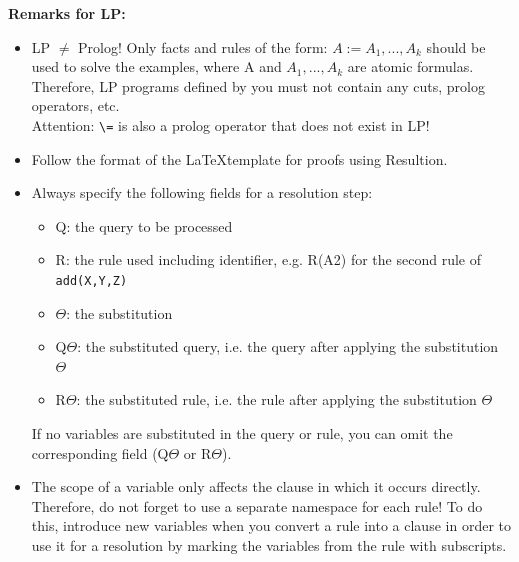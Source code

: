 \documentclass[10pt, a4paper]{article}
\begin{document}
\textbf{Remarks for LP:}
\begin{itemize}
\item LP $\neq$ Prolog! Only facts and rules of the form: $A := A_1,...,A_k$ should be used to solve the examples, where A and $A_1,...,A_k$ are atomic formulas. Therefore, LP programs defined by you must not contain any cuts, prolog operators, etc.\\
    Attention: \lstinline{\=} is also a prolog operator that does not exist in LP!
       \item Follow the format of the \LaTeX  template for proofs using Resultion.
   \item Always specify the following fields for a resolution step:
   \begin{itemize}
   \setlength\itemsep{0mm}
    \item Q: the query to be processed
    \item R: the rule used including identifier, e.g. R(A2) for the second rule of \texttt{add(X,Y,Z)}
    \item $\Theta$: the substitution
    \item Q$\Theta$: the substituted query, i.e. the query after applying the substitution $\Theta$
    \item R$\Theta$: the substituted rule, i.e. the rule after applying the substitution $\Theta$
   \end{itemize}
   If no variables are substituted in the query or rule, you can omit the corresponding field (Q$\Theta$ or R$\Theta$).
   \item The scope of a variable only affects the clause in which it occurs directly. Therefore, do not forget to use a separate namespace for each rule! To do this, introduce new variables when you convert a rule into a clause in order to use it for a resolution by marking the variables from the rule with subscripts.
 
\end{itemize}
\pagebreak
\end{document}

